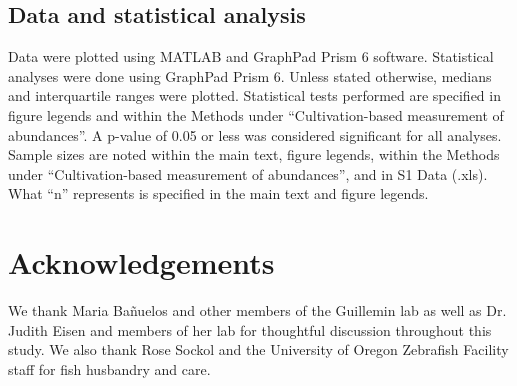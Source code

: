 \subsection{Data and statistical analysis}

Data were plotted using MATLAB and GraphPad Prism 6 software. Statistical analyses were done using GraphPad Prism 6. Unless stated otherwise, medians and interquartile ranges were plotted. Statistical tests performed are specified in figure legends and within the Methods under ``Cultivation-based measurement of abundances''. A p-value of 0.05 or less was considered significant for all analyses. Sample sizes are noted within the main text, figure legends, within the Methods under ``Cultivation-based measurement of abundances'', and in S1 Data (.xls). What ``n'' represents is specified in the main text and figure legends. 

\section{Acknowledgements}
We thank Maria Bañuelos and other members of the Guillemin lab as well as Dr. Judith Eisen and members of her lab for thoughtful discussion throughout this study. We also thank Rose Sockol and the University of Oregon Zebrafish Facility staff for fish husbandry and care.



